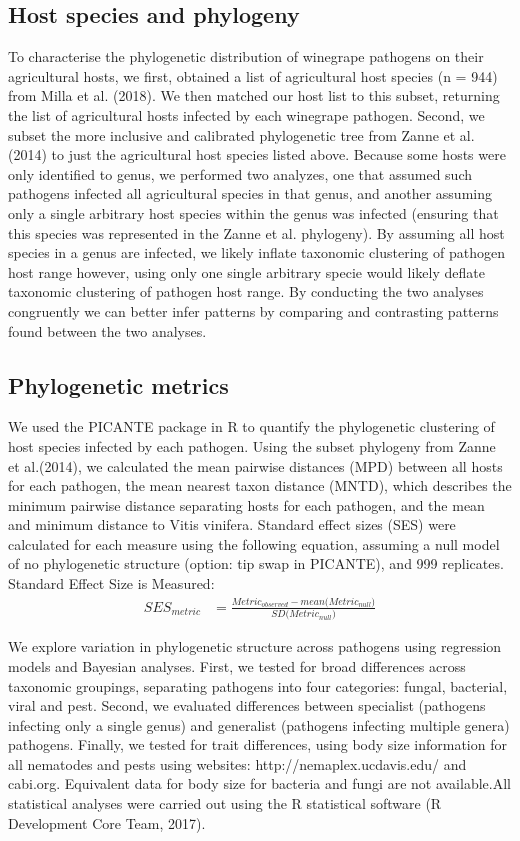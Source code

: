 \documentclass[11pt,letter]{article}
\begin{document}
\subsection{Host species and phylogeny}
To characterise the phylogenetic distribution of winegrape pathogens on their agricultural hosts, we first, obtained a list of agricultural host species (n = 944) from Milla et al. (2018). We then matched our host list to this subset, returning the list of agricultural hosts infected by each winegrape pathogen. Second, we subset the more inclusive and calibrated phylogenetic tree from Zanne et al. (2014) to just the agricultural host species listed above. Because some hosts were only identified to genus, we performed two analyzes, one that assumed such pathogens infected all agricultural species in that genus, and another assuming only a single arbitrary host species within the genus was infected (ensuring that this species was represented in the Zanne et al. phylogeny). By assuming all host species in a genus are infected, we likely inflate taxonomic clustering of pathogen host range however, using only one single arbitrary specie would likely deflate taxonomic clustering of pathogen host range. By conducting the two analyses congruently we can better infer patterns by comparing and contrasting patterns found between the two analyses.  
\subsection{Phylogenetic metrics}
We used the PICANTE package in R to quantify the phylogenetic clustering of host species infected by each pathogen. Using the subset phylogeny from Zanne et al.(2014), we calculated the mean pairwise distances (MPD) between all hosts for each pathogen, the mean nearest taxon distance (MNTD), which describes the minimum pairwise distance separating hosts for each pathogen, and the mean and minimum distance to Vitis vinifera. Standard effect sizes (SES) were calculated for each measure using the following equation, assuming a null model of no phylogenetic structure (option: tip swap in PICANTE), and 999 replicates. 
Standard Effect Size is Measured:  
\begin{align}
SES_{metric} & = \frac{Metric_{observed}-{mean({Metric_{null})}}}{SD({Metric_{null})}}
\end{align}

We explore variation in phylogenetic structure across pathogens using regression models and Bayesian analyses. First, we tested for broad differences across taxonomic groupings, separating pathogens into four categories: fungal, bacterial, viral and pest. Second, we evaluated differences between specialist (pathogens infecting only a single genus) and generalist (pathogens infecting multiple genera) pathogens. Finally, we tested for trait differences, using body size information for all nematodes and pests using websites: http://nemaplex.ucdavis.edu/ and cabi.org. Equivalent data for body size for bacteria and fungi are not available.All statistical analyses were carried out using the R statistical software (R Development Core Team, 2017).
\end{document}

